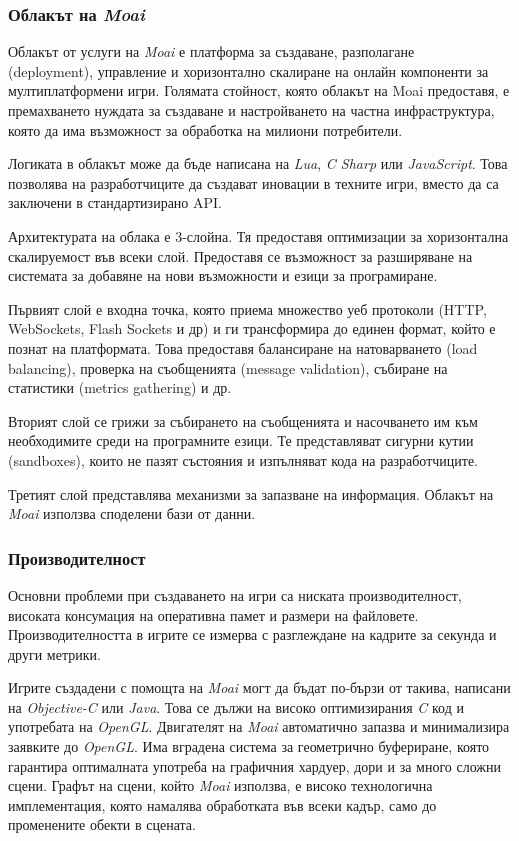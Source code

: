 		\subsubsection{Облакът на \emph{Moai}}
		
			Облакът от услуги на \emph{Moai} е платформа за създаване, разполагане\\ (deployment), управление и 
			хоризонтално скалиране на онлайн компоненти за мултиплатформени игри. Голямата стойност, която облакът
			на Moai предоставя, е премахването нуждата за създаване и настройването на частна инфраструктура, която
			да има възможност за обработка на милиони потребители.
			
			Логиката в облакът може да бъде написана на \emph{Lua}, \emph{C Sharp} или \emph{JavaScript}.
			Това позволява на разработчиците да създават иновации в техните игри, вместо да са заключени
			в стандартизирано \ac{API}.
			
			Архитектурата на облака е 3-слойна. Тя предоставя оптимизации за хоризонтална скалируемост във
			всеки слой. Предоставя се възможност за разширяване на системата за добавяне на нови възможности
			и езици за програмиране.
			
			Първият слой е входна точка, която приема множество уеб протоколи (HTTP, WebSockets, Flash Sockets и др) и ги 
			трансформира до единен формат, който е познат на платформата. Това предоставя балансиране на натоварването (load balancing),
			проверка на съобщенията (message validation), събиране на статистики (metrics gathering) и др.
			
			Вторият слой се грижи за събирането на съобщенията и насочването им към необходимите среди на програмните езици.
			Те представляват сигурни кутии (sandboxes), които не пазят състояния и изпълняват кода на разработчиците.
			
			Третият слой представлява механизми за запазване на информация. Облакът на \emph{Moai} използва споделени
			бази от данни.
			
		\subsubsection{Производителност}
		
			Основни проблеми при създаването на игри са ниската производителност, високата консумация на оперативна памет
			и размери на файловете. Производителността в игрите се измерва с разглеждане на кадрите за секунда и други метрики.
			
			Игрите създадени с помощта на \emph{Moai} могт да бъдат по-бързи от такива, написани на \emph{Objective-C} или \emph{Java}.
			Това се дължи на високо оптимизирания \emph{C} код и употребата на \emph{OpenGL}. Двигателят на \emph{Moai} автоматично
			запазва и минимализира заявките до \emph{OpenGL}. Има вградена система за геометрично буфериране, която гарантира
			оптималната употреба на графичния хардуер, дори и за много сложни сцени. Графът на сцени, който \emph{Moai} използва,
			е високо технологична имплементация, която намалява обработката във всеки кадър, само до променените обекти в сцената.
			
